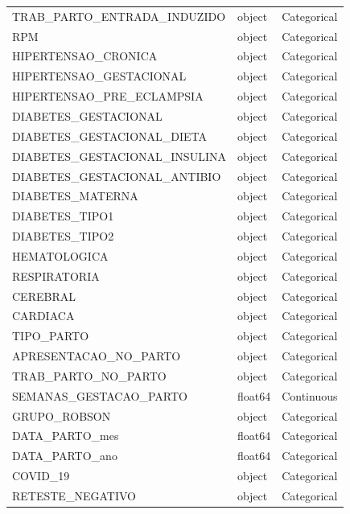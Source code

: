 \documentclass{article}
\begin{document}
\begin{longtable}{lll}
   TRAB\_PARTO\_ENTRADA\_INDUZIDO &   object &  Categorical \\
                           RPM &   object &  Categorical \\
           HIPERTENSAO\_CRONICA &   object &  Categorical \\
       HIPERTENSAO\_GESTACIONAL &   object &  Categorical \\
     HIPERTENSAO\_PRE\_ECLAMPSIA &   object &  Categorical \\
          DIABETES\_GESTACIONAL &   object &  Categorical \\
    DIABETES\_GESTACIONAL\_DIETA &   object &  Categorical \\
 DIABETES\_GESTACIONAL\_INSULINA &   object &  Categorical \\
  DIABETES\_GESTACIONAL\_ANTIBIO &   object &  Categorical \\
              DIABETES\_MATERNA &   object &  Categorical \\
                DIABETES\_TIPO1 &   object &  Categorical \\
                DIABETES\_TIPO2 &   object &  Categorical \\
                  HEMATOLOGICA &   object &  Categorical \\
                  RESPIRATORIA &   object &  Categorical \\
                      CEREBRAL &   object &  Categorical \\
                      CARDIACA &   object &  Categorical \\
                    TIPO\_PARTO &   object &  Categorical \\
         APRESENTACAO\_NO\_PARTO &   object &  Categorical \\
           TRAB\_PARTO\_NO\_PARTO &   object &  Categorical \\
        SEMANAS\_GESTACAO\_PARTO &  float64 &   Continuous \\
                  GRUPO\_ROBSON &   object &  Categorical \\
                DATA\_PARTO\_mes &  float64 &  Categorical \\
                DATA\_PARTO\_ano &  float64 &  Categorical \\
                      COVID\_19 &   object &  Categorical \\
              RETESTE\_NEGATIVO &   object &  Categorical \\
\end{longtable}
\end{document}
